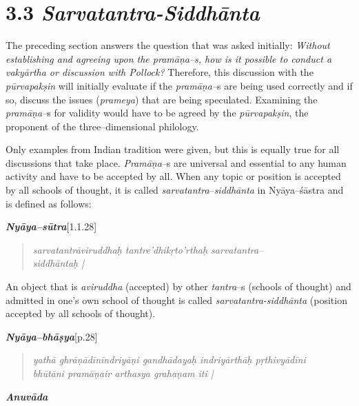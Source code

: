 \vspace{-.3cm}

\section*{3.3 {\it {\bfseries Sarvatantra-Siddhānta}}}

\vspace{-.2cm}

The preceding section answers the question that was asked initially: \textit{Without establishing and agreeing upon the pramāṇa–s, how is it possible to conduct a vakyārtha or discussion with Pollock? }Therefore, this discussion with the \textit{pūrvapakṣin} will initially evaluate if the \textit{pramāṇa–}s are being used correctly and if so, discuss the issues (\textit{prameya}) that are being speculated. Examining the \textit{pramāṇa–}s for validity would have to be agreed by the \textit{pūrvapakṣin}, the proponent of the three–dimensional philology.

Only examples from Indian tradition were given, but this is equally true for all discussions that take place. \textit{Pramāṇa}–s are universal and essential to any human activity and have to be accepted by all. When any topic or position is accepted by all schools of thought, it is called \textit{sarvatantra}–\textit{siddhānta} in Nyāya–śāstra and is defined as follows:


\textit{\textbf{Nyāya–sūtra}}[1.1.28]

\begin{verse}
\textit{sarvatantrāviruddhaḥ tantre'dhikṛto'rthaḥ sarvatantra–\\ siddhāntaḥ |}
\end{verse}

\newpage

An object that is \textit{aviruddha} (accepted) by other \textit{tantra}–s (schools of thought) and admitted in one's own school of thought is called \textit{sarvatantra-siddhānta} (position accepted by all schools of thought).

\textit{\textbf{Nyāya–bhāṣya}}[p.28]

\begin{verse}
\textit{yathā ghrāṇādīnīndriyāṇi gandhādayaḥ indriyārthāḥ pṛthivyādīni\\ bhūtāni pramāṇair arthasya grahaṇam iti |}
\end{verse}

\textit{\textbf{Anuvāda}}

